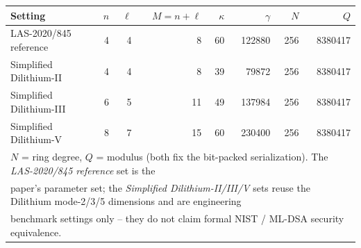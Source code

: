 \begin{tabular}{l r r r r r r r}
\hline
Setting & $n$ & $\ell$ & $M=n+\ell$ & $\kappa$ & $\gamma$ & $N$ & $Q$ \\
\hline
LAS-2020/845 reference & 4 & 4 & 8 & 60 & 122880 & 256 & 8380417 \\
Simplified Dilithium-II & 4 & 4 & 8 & 39 & 79872 & 256 & 8380417 \\
Simplified Dilithium-III & 6 & 5 & 11 & 49 & 137984 & 256 & 8380417 \\
Simplified Dilithium-V & 8 & 7 & 15 & 60 & 230400 & 256 & 8380417 \\
\hline
\multicolumn{8}{l}{\footnotesize $N$ = ring degree, $Q$ = modulus (both fix the bit-packed serialization). The \emph{LAS-2020/845 reference} set is the} \\
\multicolumn{8}{l}{\footnotesize paper's parameter set; the \emph{Simplified Dilithium-II/III/V} sets reuse the Dilithium mode-2/3/5 dimensions and are engineering} \\
\multicolumn{8}{l}{\footnotesize benchmark settings only -- they do not claim formal NIST / ML-DSA security equivalence.} \\
\hline
\end{tabular}
